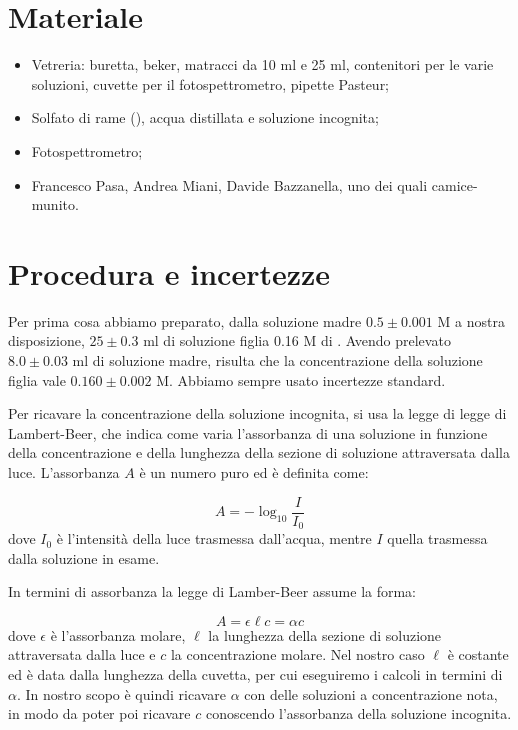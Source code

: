 \section*{Materiale}

\begin{itemize}
        \setlength{\parskip}{-1pt}
        \item{Vetreria: buretta, beker, matracci da 10 ml e 25 ml,
            contenitori per le varie soluzioni, cuvette per il fotospettrometro,
            pipette Pasteur;}
        \item{Solfato di rame (), acqua distillata e soluzione incognita;}
        \item{Fotospettrometro;}
        \item{Francesco Pasa, Andrea Miani, Davide Bazzanella, uno dei quali camice-munito.}
\end{itemize}

\section*{Procedura e incertezze}

Per prima cosa abbiamo preparato, dalla soluzione madre $0.5 \pm 0.001$ M a
nostra disposizione, $25 \pm 0.3$ ml di soluzione figlia 0.16 M
di . Avendo prelevato $8.0 \pm 0.03$ ml di soluzione madre, risulta che
la concentrazione della soluzione figlia vale $0.160 \pm 0.002 $ M. Abbiamo sempre
usato incertezze standard.

Per ricavare la concentrazione della soluzione incognita, si usa la legge di legge
di Lambert-Beer, che indica come varia l'assorbanza di una soluzione in funzione
della concentrazione e della lunghezza della sezione di soluzione attraversata dalla luce.
L'assorbanza $A$ è un numero puro ed è definita come:

\begin{equation}
    A = - \log_{10}{\frac{I}{I_0}}
\end{equation}
%
dove $I_0$ è l'intensità della luce trasmessa dall'acqua, mentre $I$ quella trasmessa
dalla soluzione in esame.

In termini di assorbanza la legge di Lamber-Beer assume la forma:

\begin{equation}
    A = \epsilon \ell c = \alpha c
\end{equation}
%
dove $\epsilon$ è l'assorbanza molare, $\ell$ la lunghezza della sezione di soluzione
attraversata dalla luce e $c$ la concentrazione molare. Nel nostro caso $\ell$ è costante
ed è data dalla lunghezza della cuvetta, per cui eseguiremo i calcoli in termini di
$\alpha$. In nostro scopo è quindi ricavare $\alpha$ con delle soluzioni a concentrazione
nota, in modo da poter poi ricavare $c$ conoscendo l'assorbanza della soluzione
incognita.

